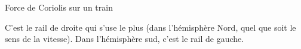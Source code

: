 \begin{exo}[PC][1][TD]{Force de Coriolis sur un train}
\begin{quest}
{%

C'est le rail de droite qui s'use le plus (dans l'hémisphère Nord, quel que soit le sens de la vitesse). Dans l’hémisphère sud, c’est le rail de gauche.
}

\end{quest}
\end{exo}

